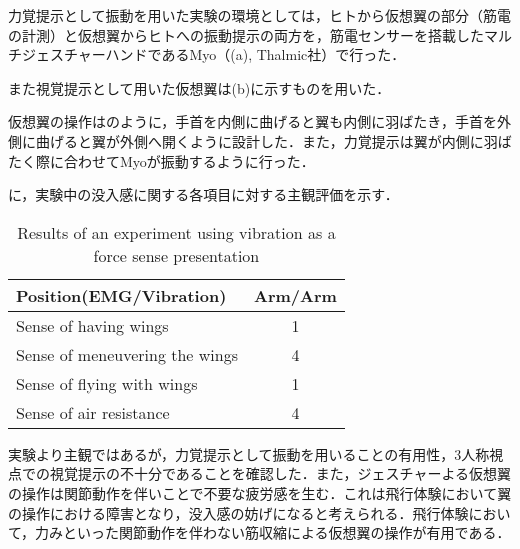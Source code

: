     


    力覚提示として振動を用いた実験の環境としては，ヒトから仮想翼の部分（筋電の計測）と仮想翼からヒトへの振動提示の両方を，筋電センサーを搭載したマルチジェスチャーハンドであるMyo（(a), Thalmic社）で行った．

    また視覚提示として用いた仮想翼は(b)に示すものを用いた．

    仮想翼の操作はのように，手首を内側に曲げると翼も内側に羽ばたき，手首を外側に曲げると翼が外側へ開くように設計した．また，力覚提示は翼が内側に羽ばたく際に合わせてMyoが振動するように行った．

    に，実験中の没入感に関する各項目に対する主観評価を示す．
        \begin{table}[h]
            \begin{center}
                \caption{Results of an experiment using vibration as a force sense presentation}
                \scalebox{0.75}
                {
                    \begin{tabular}{l|c}
                        \hline
                        Position(EMG/Vibration) & Arm/Arm \\\hline
                        Sense of having wings & 1 \\
                        Sense of meneuvering the wings & 4 \\
                        Sense of flying with wings & 1 \\
                        Sense of air resistance & 4 \\\hline
                    \end{tabular}
                }
            \end{center}
        \end{table}
    

    実験より主観ではあるが，力覚提示として振動を用いることの有用性，3人称視点での視覚提示の不十分であることを確認した．また，ジェスチャーよる仮想翼の操作は関節動作を伴いことで不要な疲労感を生む．これは飛行体験において翼の操作における障害となり，没入感の妨げになると考えられる．飛行体験において，力みといった関節動作を伴わない筋収縮による仮想翼の操作が有用である．


